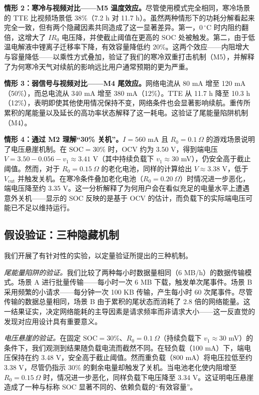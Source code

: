 \documentclass[11pt,a4paper]{ctexart}
\begin{document}
\textbf{情形 2：寒冷与视频对比——M5 温度效应。}尽管使用模式完全相同，寒冷场景的 TTE 比视频场景低 38\%（7.2 h 对 11.7 h）。虽然两种情形下的功耗分解看起来完全一致，但有两个隐藏因素共同造成了这一显著差异。第一，$0\,^{\circ}$C 时内阻约翻倍，这增大了 $IR_0$ 电压降，并使截止阈值在更高的 SOC 处被触发。第二，由于低温电解液中锂离子迁移率下降，有效容量降低约 20\%。这两个效应——内阻增大与容量降低——以乘性方式叠加，验证了我们的寒冷双重打击机制（M5），并解释了为何寒冷天气对续航的影响远比用户通常预期的更为严重。

\textbf{情形 3：弱信号与视频对比——M4 尾效应。}网络电流从 80 mA 增至 120 mA（50\%），而总电流从 340 mA 增至 380 mA（12\%）。TTE 从 11.7 h 降至 10.3 h（12\%），表明即使其他使用情况保持不变，网络条件也会显著影响续航。重传所累积的尾能量以及延长的高功率状态解释了这一耗电。这验证了尾能量陷阱机制（M4）。

\textbf{情形 4：通过 M2 理解“30\% 关机”。}$I = 560$ mA 且 $R_0 = 0.1\ \Omega$ 的游戏场景说明了电压悬崖机制。在 $\mathrm{SOC} = 30\%$ 时，OCV 约为 3.50 V，得到端电压 $V = 3.50 - 0.056 - v_1 \approx 3.41$ V（其中持续负载下 $v_1 \approx 30$ mV），仍安全高于截止阈值。然而，对于 $R_0 = 0.15\ \Omega$ 的老化电池，同样的计算给出 $V \approx 3.38$ V，低于 $V_{\mathrm{cut}}$ 并触发关机。在寒冷条件叠加老化电池（$R_0 = 0.20\ \Omega$）时情况进一步恶化，端电压降至约 3.35 V。这一分析解释了为何用户会在看似充足的电量水平上遭遇意外关机——显示的 SOC 反映的是基于 OCV 的估计，而负载下的实际端电压可能已不足以维持运行。

\subsection{假设验证：三种隐藏机制}

我们开展了有针对性的实验，以定量验证所提出的三种机制。

\textit{尾能量陷阱的验证。}我们比较了两种每小时数据量相同（6 MB/h）的数据传输模式。场景 A 进行批量传输——每小时一次 6 MB 下载，触发单次尾事件。场景 B 采用频繁的小请求——每分钟一次 100 KB 传输，产生每小时 60 次尾事件。尽管传输的数据总量相同，场景 B 由于累积的尾状态而消耗了 2.8 倍的网络能量。这一结果证实，决定网络能耗的主导因素是请求频率而非请求大小——这一反直觉的发现对应用设计具有重要意义。

\textit{电压悬崖的验证。}在固定 $\mathrm{SOC} = 30\%$、$R_0 = 0.1\ \Omega$（持续负载下 $v_1 \approx 30$ mV）的条件下，我们观测到结果随负载电流而截然不同。在轻负载（100 mA）下，端电压保持在约 3.48 V，安全高于截止阈值。然而重负载（800 mA）将电压拉低至约 3.38 V，尽管仍指示 30\% 的剩余电量却触发了关机。当电池老化使内阻增至 $R_0 = 0.15\ \Omega$ 时，情况进一步恶化，同样负载下电压降至 3.34 V。这证明电压悬崖造成了一种与标称 SOC 显著不同的、依赖负载的“有效容量”。
\end{document}
